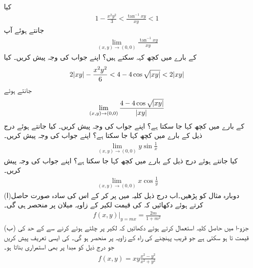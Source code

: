کیا 
\begin{align*}
1-\frac{x^2y^2}{3}<\frac{\tan^{-1}xy}{xy}<1
\end{align*}
جانتے ہوئے آپ
\begin{align*}
\lim\limits_{(x,y)\to(0,0)}\frac{\tan^{-1}xy}{xy}
\end{align*}
کے بارے میں کچھ کہہ سکتے ہیں؟ اپنے جواب کی وجہ پیش کریں۔
کیا
\begin{align*}
2\abs{xy}-\frac{x^2y^2}{6}<4-4\cos\sqrt{\abs{xy}}<2\abs{xy}
\end{align*}
جانتے ہوئے
\begin{align*}
\lim\limits_{(x,y)\to(0,0)}\frac{4-4\cos\sqrt{\abs{xy}}}{\abs{xy}}
\end{align*}
کے بارے میں کچھ کہا جا سکتا ہے؟ اپنے جواب کی وجہ پیش کریں۔
کیا  جانتے ہوئے درج ذیل کے بارے میں کچھ کہا جا سکتا ہے؟ اپنے جواب کی وجہ پیش کریں۔
\begin{align*}
\lim\limits_{(x,y)\to(0,0)}y\sin\frac{1}{x}
\end{align*}
کیا  جانتے ہوئے درج ذیل کے بارے میں کچھ کہا جا سکتا ہے؟ اپنے جواب کی وجہ پیش کریں۔
\begin{align*}
\lim\limits_{(x,y)\to(0,0)}x\cos\frac{1}{y}
\end{align*}
(ا)دوبارہ  مثال  کو  پڑھیں۔اب درج ذیل کلیہ میں  پر کر کے اس کی سادہ صورت حاصل کرتے ہوئے دکھائیں کہ  کی قیمت  لکیر کے زاویہ میلان  پر منحصر ہی گی۔
\begin{align*}
\left.f(x,y)\right\vert_{y=mx}=\frac{2m}{1+m^2}
\end{align*}
(ب) جزو-ا میں حاصل کلیہ استعمال کرتے ہوئے دکھائیں کہ لکیر  پر چلتے ہوئے  کرنے سے  کے  حد کی قیمت  تا  ہو سکتی ہے جو قریب پہنچنے کی راہ کے  زاویہ پر منحصر ہو گی۔  
 کی ایسی تعریف پیش کریں جو درج ذیل کو مبدا پر بھی استمراری بناتا ہو۔
\begin{align*}
f(x,y)=xy\frac{x^2-y^2}{x^2+y^2}
\end{align*}

